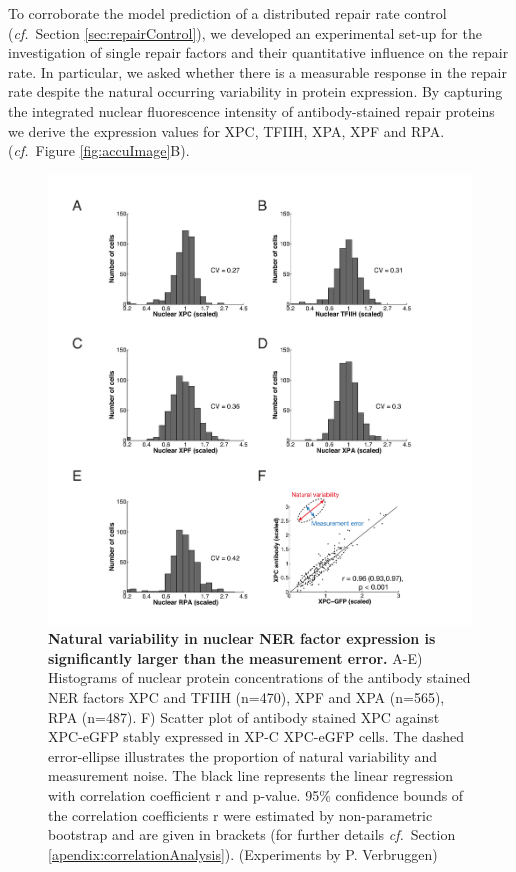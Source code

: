 To corroborate the model prediction of a distributed repair rate control (\textit{cf.}\ Section \ref{sec:repairControl}), we developed an experimental set-up for the investigation of single repair factors and their quantitative influence on the repair rate. In particular, we asked whether there is a measurable response in the repair rate despite the natural occurring variability in protein expression. By capturing the integrated nuclear fluorescence intensity of antibody-stained repair proteins we derive the expression values for XPC, TFIIH, XPA, XPF and RPA. (\textit{cf.}\ Figure \ref{fig:accuImage}B).
\begin{figure}[h!]
	\begin{center}
		\includegraphics[width=1\textwidth]{Abbildungen/figure3_2.pdf}
		\caption{\textbf{Natural variability in nuclear NER factor expression is significantly larger than the measurement error.} A-E) Histograms of nuclear protein concentrations of the antibody stained NER factors XPC and TFIIH (n=470), XPF and XPA (n=565), RPA (n=487). F) Scatter plot of antibody stained XPC against XPC-eGFP stably expressed in XP-C XPC-eGFP cells. The dashed error-ellipse illustrates the proportion of natural variability and measurement noise. The black line represents the linear regression with correlation coefficient r and p-value. 95\% confidence bounds of the correlation coefficients r were estimated by non-parametric bootstrap and are given in brackets (for further details \textit{cf.}\ Section \ref{apendix:correlationAnalysis}). (Experiments by P. Verbruggen)}
		\label{fig:ProteinDist}
	\end{center}
\end{figure}

